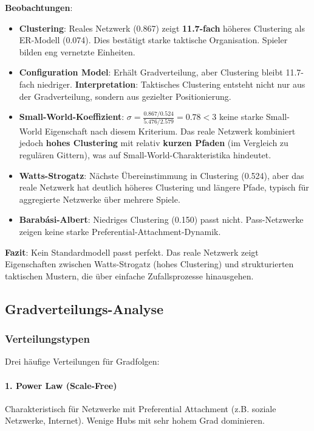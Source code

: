 \textbf{Beobachtungen}:
\begin{itemize}
  \item \textbf{Clustering}: Reales Netzwerk (0.867) zeigt \textbf{11.7-fach} höheres Clustering als ER-Modell (0.074). Dies bestätigt starke taktische Organisation. Spieler bilden eng vernetzte Einheiten.
  \item \textbf{Configuration Model}: Erhält Gradverteilung, aber Clustering bleibt 11.7-fach niedriger. \textbf{Interpretation}: Taktisches Clustering entsteht nicht nur aus der Gradverteilung, sondern aus gezielter Positionierung.
  \item \textbf{Small-World-Koeffizient}: $\sigma = \frac{0.867 / 0.524}{5.476 / 2.579} = 0.78 < 3$ keine starke Small-World Eigenschaft nach diesem Kriterium. Das reale Netzwerk kombiniert jedoch \textbf{hohes Clustering} mit relativ \textbf{kurzen Pfaden} (im Vergleich zu regulären Gittern), was auf Small-World-Charakter\-istika hindeutet.
  \item \textbf{Watts-Strogatz}: Nächste Übereinstimmung in Clustering (0.524), aber das reale Netzwerk hat deutlich höheres Clustering und längere Pfade, typisch für aggregierte Netzwerke über mehrere Spiele.
  \item \textbf{Barabási-Albert}: Niedriges Clustering (0.150) passt nicht. Pass-Netzwerke zeigen keine starke Preferential-Attachment-Dynamik.
\end{itemize}

\textbf{Fazit}: Kein Standardmodell passt perfekt. Das reale Netzwerk zeigt Eigenschaften zwischen Watts-Strogatz (hohes Clustering) und strukturierten taktischen Mustern, die über einfache Zufallsprozesse hinausgehen.

\subsection{Gradverteilungs-Analyse}

\subsubsection{Verteilungstypen}

Drei häufige Verteilungen für Gradfolgen:

\paragraph{1. Power Law (Scale-Free)}
Charakteristisch für Netzwerke mit Preferential Attachment (z.B. soziale Netzwerke, Internet). Wenige Hubs mit sehr hohem Grad dominieren.


